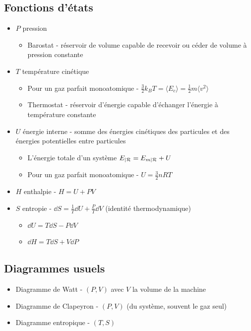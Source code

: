 \documentclass[openany]{book}
\begin{document}
\subsection{Fonctions d'états}
\begin{itemize}
    \item $P$ pression
    \begin{itemize}
        \item Barostat - réservoir de volume capable de recevoir ou céder de volume à pression constante
    \end{itemize}
    \item $T$ température cinétique
    \begin{itemize}
        \item Pour un gaz parfait monoatomique - $\frac{3}{2}k_B T =  \langle E_c \rangle = \frac{1}{2}m \langle v^2 \rangle$
        \item Thermostat - réservoir d'énergie capable d'échanger l'énergie à température constante
    \end{itemize}
    \item $U$ énergie interne - somme des énergies cinétiques des particules et des énergies potentielles entre particules
    \begin{itemize}
        \item L'énergie totale d'un système $ E_{|\mathcal{R}} = E_{m |\mathcal{R}} + U $
        \item Pour un gaz parfait monoatomique - $U = \frac{3}{2}nRT$
    \end{itemize}
    \item $H$ enthalpie - $H = U + PV$
    \item $S$ entropie - $\dd S = \frac{1}{T}\dd U + \frac{P}{T} \dd V$ (identité thermodynamique)
    \begin{itemize}
        \item $\dd U = T \dd S - P \dd V$
        \item $\dd H = T \dd S + V \dd P$
    \end{itemize}
\end{itemize}

\subsection{Diagrammes usuels}

\begin{itemize}
    \item Diagramme de Watt - $(P,V)$ avec $V$ la volume de la machine
    \item Diagramme de Clapeyron - $(P, V)$ (du système, souvent le gaz seul)
    \item Diagramme entropique - $(T, S)$
\end{itemize}
\end{document}
